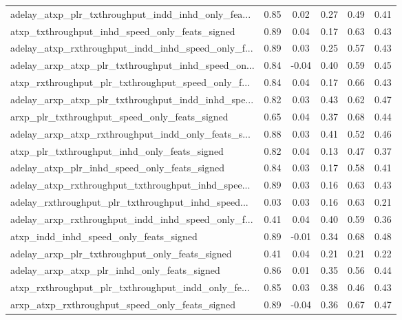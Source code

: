 \begin{tabular}{|l|*{4}{c}|r|}
adelay\_atxp\_plr\_txthroughput\_indd\_inhd\_only\_fea... & 0.85 &  0.02 &    0.27 &       0.49 &  0.41 \\
atxp\_txthroughput\_inhd\_speed\_only\_feats\_signed     & 0.89 &  0.04 &    0.17 &       0.63 &  0.43 \\
adelay\_atxp\_rxthroughput\_indd\_inhd\_speed\_only\_f... & 0.89 &  0.03 &    0.25 &       0.57 &  0.43 \\
adelay\_arxp\_atxp\_plr\_txthroughput\_inhd\_speed\_on... & 0.84 & -0.04 &    0.40 &       0.59 &  0.45 \\
atxp\_rxthroughput\_plr\_txthroughput\_speed\_only\_f... & 0.84 &  0.04 &    0.17 &       0.66 &  0.43 \\
adelay\_arxp\_atxp\_plr\_txthroughput\_indd\_inhd\_spe... & 0.82 &  0.03 &    0.43 &       0.62 &  0.47 \\
arxp\_plr\_txthroughput\_speed\_only\_feats\_signed      & 0.65 &  0.04 &    0.37 &       0.68 &  0.44 \\
adelay\_arxp\_atxp\_rxthroughput\_indd\_only\_feats\_s... & 0.88 &  0.03 &    0.41 &       0.52 &  0.46 \\
atxp\_plr\_txthroughput\_inhd\_only\_feats\_signed       & 0.82 &  0.04 &    0.13 &       0.47 &  0.37 \\
adelay\_atxp\_plr\_inhd\_speed\_only\_feats\_signed       & 0.84 &  0.03 &    0.17 &       0.58 &  0.41 \\
adelay\_atxp\_rxthroughput\_txthroughput\_inhd\_spee... & 0.89 &  0.03 &    0.16 &       0.63 &  0.43 \\
adelay\_rxthroughput\_plr\_txthroughput\_inhd\_speed... & 0.03 &  0.03 &    0.16 &       0.63 &  0.21 \\
adelay\_arxp\_rxthroughput\_indd\_inhd\_speed\_only\_f... & 0.41 &  0.04 &    0.40 &       0.59 &  0.36 \\
atxp\_indd\_inhd\_speed\_only\_feats\_signed             & 0.89 & -0.01 &    0.34 &       0.68 &  0.48 \\
adelay\_arxp\_plr\_txthroughput\_only\_feats\_signed     & 0.41 &  0.04 &    0.21 &       0.21 &  0.22 \\
adelay\_arxp\_atxp\_plr\_inhd\_only\_feats\_signed        & 0.86 &  0.01 &    0.35 &       0.56 &  0.44 \\
atxp\_rxthroughput\_plr\_txthroughput\_indd\_only\_fe... & 0.85 &  0.03 &    0.38 &       0.46 &  0.43 \\
arxp\_atxp\_rxthroughput\_speed\_only\_feats\_signed     & 0.89 & -0.04 &    0.36 &       0.67 &  0.47 \\

\end{tabular}
